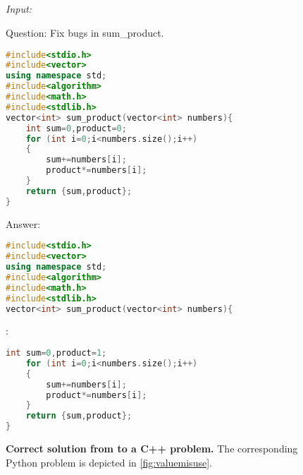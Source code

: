 \subsection{\model{}}
\label{sec:examplesmodel}

\begin{figure}[htbp]
\hrulefill

\emph{Input:}

\hrulefill

Question: Fix bugs in sum\_product.
\begin{lstlisting}[language=C++,breaklines=true,basicstyle=\ttfamily\scriptsize]
#include<stdio.h>
#include<vector>
using namespace std;
#include<algorithm>
#include<math.h>
#include<stdlib.h>
vector<int> sum_product(vector<int> numbers){
    int sum=0,product=0;
    for (int i=0;i<numbers.size();i++)
    {
        sum+=numbers[i];
        product*=numbers[i];
    }
    return {sum,product};
}
\end{lstlisting}

Answer:
\begin{lstlisting}[language=C++,breaklines=true,basicstyle=\ttfamily\scriptsize]
#include<stdio.h>
#include<vector>
using namespace std;
#include<algorithm>
#include<math.h>
#include<stdlib.h>
vector<int> sum_product(vector<int> numbers){
\end{lstlisting}

\hrulefill

\model{}:

\hrulefill

\begin{lstlisting}[language=C++,breaklines=true,basicstyle=\ttfamily\scriptsize]
    int sum=0,product=1;
    for (int i=0;i<numbers.size();i++)
    {
        sum+=numbers[i];
        product*=numbers[i];
    }
    return {sum,product};
}
\end{lstlisting}

\hrulefill

\caption{\textbf{Correct solution from \model{} to a \evalf{} C++ problem.} The corresponding Python problem is depicted in \autoref{fig:valuemisuse}.}
\label{fig:modelcpp}
\end{figure}

